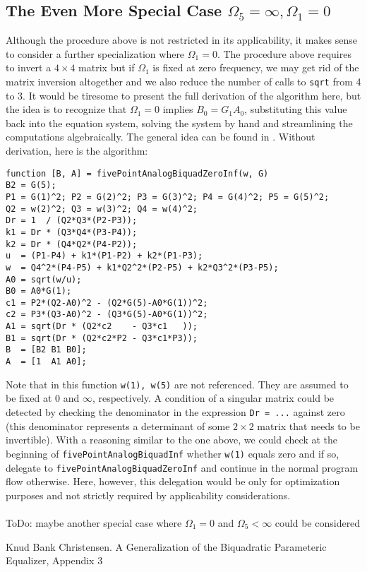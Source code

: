 \subsection{The Even More Special Case $\Omega_5 = \infty, \Omega_1 = 0$}
Although the procedure above is not restricted in its applicability, it makes sense to consider a further specialization where $\Omega_1 = 0$. The procedure above requires to invert a $4 \times 4$ matrix but if $\Omega_1$ is fixed at zero frequency, we may get rid of the matrix inversion altogether and we also reduce the number of calls to \texttt{sqrt} from 4 to 3. It would be tiresome to present the full derivation of the algorithm here, but the idea is to recognize that $\Omega_1 = 0$ implies $B_0 = G_1 A_0$, substituting this value back into the equation system, solving the system by hand and streamlining the computations algebraically. The general idea can be found in \cite{Chr}. Without derivation, here is the algorithm:
\begin{verbatim}
function [B, A] = fivePointAnalogBiquadZeroInf(w, G)
B2 = G(5);   
P1 = G(1)^2; P2 = G(2)^2; P3 = G(3)^2; P4 = G(4)^2; P5 = G(5)^2;             
Q2 = w(2)^2; Q3 = w(3)^2; Q4 = w(4)^2;
Dr = 1  / (Q2*Q3*(P2-P3));
k1 = Dr * (Q3*Q4*(P3-P4));
k2 = Dr * (Q4*Q2*(P4-P2));
u  = (P1-P4) + k1*(P1-P2) + k2*(P1-P3);
w  = Q4^2*(P4-P5) + k1*Q2^2*(P2-P5) + k2*Q3^2*(P3-P5);
A0 = sqrt(w/u);
B0 = A0*G(1);
c1 = P2*(Q2-A0)^2 - (Q2*G(5)-A0*G(1))^2;
c2 = P3*(Q3-A0)^2 - (Q3*G(5)-A0*G(1))^2;
A1 = sqrt(Dr * (Q2*c2    - Q3*c1   ));
B1 = sqrt(Dr * (Q2*c2*P2 - Q3*c1*P3));
B  = [B2 B1 B0];
A  = [1  A1 A0];
\end{verbatim}
Note that in this function \texttt{w(1), w(5)} are not referenced. They are assumed to be fixed at $0$ and $\infty$, respectively. A condition of a singular matrix could be detected by checking the denominator in the expression \texttt{Dr = ...} against zero (this denominator represents a determinant of some $2 \times 2$ matrix that needs to be invertible). With a reasoning similar to the one above, we could check at the beginning of \texttt{fivePointAnalogBiquadInf} whether \texttt{w(1)} equals zero and if so, delegate to \texttt{fivePointAnalogBiquadZeroInf} and continue in the normal program flow otherwise. Here, however, this delegation would be only for optimization purposes and not strictly required by applicability considerations.


\paragraph{}
ToDo: maybe another special case where $\Omega_1 = 0$ and $\Omega_5 < \infty$ could be considered






\begin{thebibliography}{9}  %
  Knud Bank Christensen. A Generalization of the Biquadratic Parameteric Equalizer, Appendix 3
\end{thebibliography}

